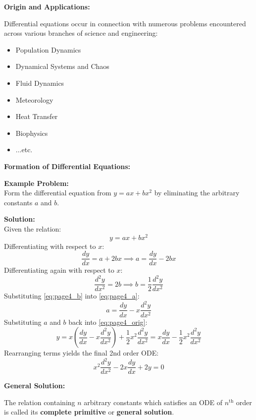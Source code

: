 \documentclass[11pt,a4paper]{article}
\newcommand{\Heading}[1]{\vspace{0.3cm}\noindent\textbf{\textcolor{AcademicGreen}{\large #1}}\par\vspace{0.15cm}}
\begin{document}
\Heading{Origin and Applications:}
Differential equations occur in connection with numerous problems encountered across various branches of science and engineering:
\begin{itemize}[leftmargin=0.5cm, itemsep=0.05cm]
    \item Population Dynamics
    \item Dynamical Systems and Chaos
    \item Fluid Dynamics
    \item Meteorology
    \item Heat Transfer
    \item Biophysics
    \item ...etc.
\end{itemize}

\Heading{Formation of Differential Equations:}
\noindent\textbf{Example Problem:} \\
Form the differential equation from $y = ax + bx^2$ by eliminating the arbitrary constants $a$ and $b$.

\noindent\textbf{Solution:} \\
Given the relation:
\begin{equation}
    y = ax + bx^2 \label{eq:page4_orig}
\end{equation}
Differentiating with respect to $x$:
\begin{equation}
    \frac{dy}{dx} = a + 2bx \implies a = \frac{dy}{dx} - 2bx \label{eq:page4_a}
\end{equation}
Differentiating again with respect to $x$:
\begin{equation}
    \frac{d^2y}{dx^2} = 2b \implies b = \frac{1}{2}\frac{d^2y}{dx^2} \label{eq:page4_b}
\end{equation}
Substituting \eqref{eq:page4_b} into \eqref{eq:page4_a}:
\[ a = \frac{dy}{dx} - x\frac{d^2y}{dx^2} \]
Substituting $a$ and $b$ back into \eqref{eq:page4_orig}:
\[ y = x\left(\frac{dy}{dx} - x\frac{d^2y}{dx^2}\right) + \frac{1}{2}x^2\frac{d^2y}{dx^2} = x\frac{dy}{dx} - \frac{1}{2}x^2\frac{d^2y}{dx^2} \]
Rearranging terms yields the final 2nd order ODE:
\[ x^2\frac{d^2y}{dx^2} - 2x\frac{dy}{dx} + 2y = 0 \]

\newpage


\Heading{General Solution:}
The relation containing $n$ arbitrary constants which satisfies an ODE of $n^{\text{th}}$ order is called its \textbf{complete primitive} or \textbf{general solution}.
\end{document}
